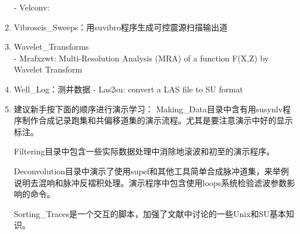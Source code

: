 \begin{enumerate}
	- Velconv: 
	\item Vibroseis\_Sweeps：用suvibro程序生成可控震源扫描输出道
	\item Wavelet\_Transforms\\
	- Mrafxzwt: Multi-Resolution Analysis (MRA) of a function F(X,Z) by Wavelet Transform
	\item Well\_Log：测井数据
	- Las2su: convert a LAS file to SU format
	\item 建议新手按下面的顺序进行演示学习：
	Making\_Data目录中含有用susynlv程序制作合成记录跑集和共偏移道集的演示流程。尤其是要注意演示中好的显示标注。\par
	Filtering目录中包含一些实际数据处理中消除地滚波和初至的演示程序。\par
	Deconvolution目录中演示了使用supef和其他工具简单合成脉冲道集，来举例说明去混响和脉冲反褶积处理。演示程序中包含使用loops系统检验滤波参数影响的命令。\par
	Sorting\_Traces是一个交互的脚本，加强了文献中讨论的一些Unix和SU基本知识。
\end{enumerate}